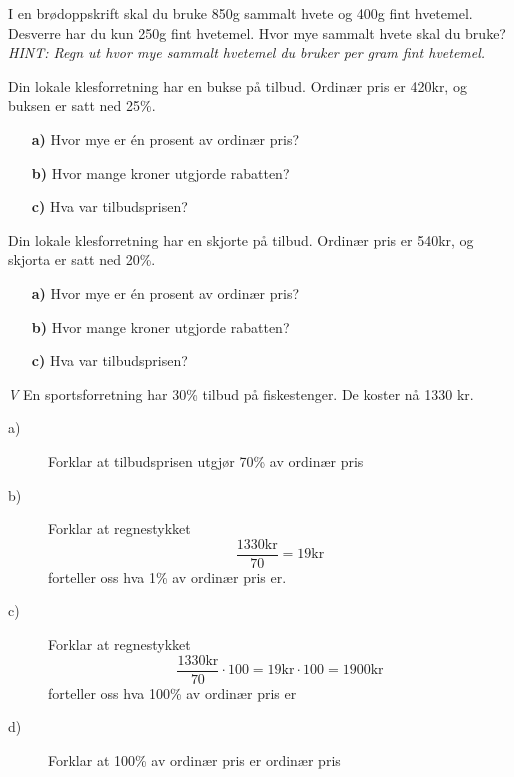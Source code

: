 \documentclass[a4, 11pt, twoside]{article}
\theoremstyle{definition}
\begin{document}
\begin{Exercise}
  I en brødoppskrift skal du bruke 850g sammalt hvete og
  400g fint hvetemel. Desverre har du kun 250g fint hvetemel.
  Hvor mye sammalt hvete skal du bruke?
  \newline
  \it{HINT: Regn ut hvor mye sammalt hvetemel du bruker per gram fint hvetemel.}
\end{Exercise}

\begin{Exercise}
Din lokale klesforretning har en bukse på tilbud. Ordinær pris er
420kr, og buksen er satt ned 25\%.
\begin{itemize}
\item[\bf a)] Hvor mye er én prosent av ordinær pris?
\item[\bf b)] Hvor mange kroner utgjorde rabatten?
\item[\bf c)] Hva var tilbudsprisen?
\end{itemize}
\end{Exercise}


\begin{Exercise}
Din lokale klesforretning har en skjorte på tilbud. Ordinær pris er
540kr, og skjorta er satt ned 20\%.
\begin{itemize}
\item[\bf a)] Hvor mye er én prosent av ordinær pris?
\item[\bf b)] Hvor mange kroner utgjorde rabatten?
\item[\bf c)] Hva var tilbudsprisen?
\end{itemize}
\end{Exercise}

\begin{Exercise}
\textit{V}\newline
  En sportsforretning har 30\% tilbud på fiskestenger. De koster nå 1330 kr.
  \begin{description}
    \item[a)] Forklar at tilbudsprisen utgjør 70\% av ordinær pris
    \item[b)] Forklar at regnestykket \[ \frac{1330\text{kr}}{70} = 19\text{kr} \] forteller oss
      hva 1\% av ordinær pris er.
    \item[c)] Forklar at regnestykket \[\frac{1330\text{kr}}{70}\cdot100 = 19\text{kr}\cdot100 = 1900\text{kr} \]
      forteller oss hva 100\% av ordinær pris er
    \item[d)] Forklar at 100\% av ordinær pris er ordinær pris
  \end{description}
\end{Exercise}
\end{document}
